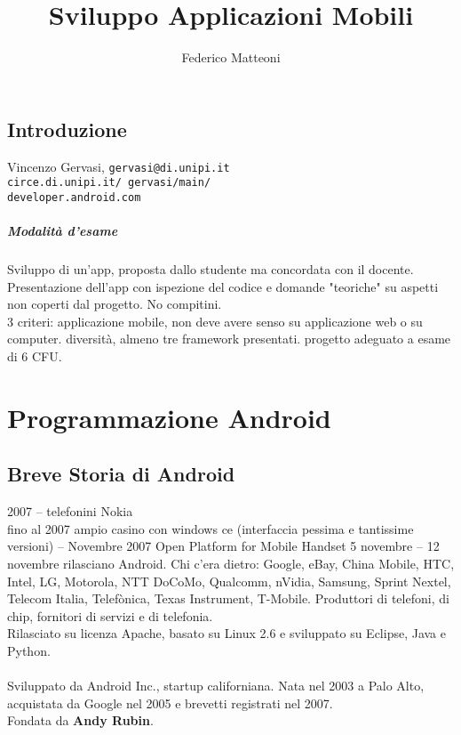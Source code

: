 \documentclass[10pt]{book}
\begin{document}
\renewcommand*\contentsname{Indice}
\title{Sviluppo Applicazioni Mobili}
\author{Federico Matteoni}
\date{ }
\maketitle
\tableofcontents
\pagebreak
\section*{Introduzione}
Vincenzo Gervasi, \texttt{gervasi@di.unipi.it}\\
\texttt{circe.di.unipi.it/~gervasi/main/}\\
\texttt{developer.android.com}

\paragraph{Modalità d'esame} Sviluppo di un'app, proposta dallo studente ma concordata con il docente. Presentazione dell'app con ispezione del codice e domande "teoriche" su aspetti non coperti dal progetto. No compitini.\\
3 criteri: applicazione mobile, non deve avere senso su applicazione web o su computer. diversità, almeno tre framework presentati. progetto adeguato a esame di 6 CFU.

\chapter{Programmazione Android}
\section{Breve Storia di Android}
2007 -- telefonini Nokia\\
fino al 2007 ampio casino con windows ce (interfaccia pessima e tantissime versioni) -- Novembre 2007 Open Platform for Mobile Handset 5 novembre -- 12 novembre rilasciano Android. Chi c'era dietro: Google, eBay, China Mobile, HTC, Intel, LG, Motorola, NTT DoCoMo, Qualcomm, nVidia, Samsung, Sprint Nextel, Telecom Italia, Telefònica, Texas Instrument, T-Mobile. Produttori di telefoni, di chip, fornitori di servizi e di telefonia.\\
Rilasciato su licenza Apache, basato su Linux 2.6 e sviluppato su Eclipse, Java e Python.\\\\
Sviluppato da Android Inc., startup californiana. Nata nel 2003 a Palo Alto, acquistata da Google nel 2005 e brevetti registrati nel 2007.\\
Fondata da \textbf{Andy Rubin}.
\end{document}
